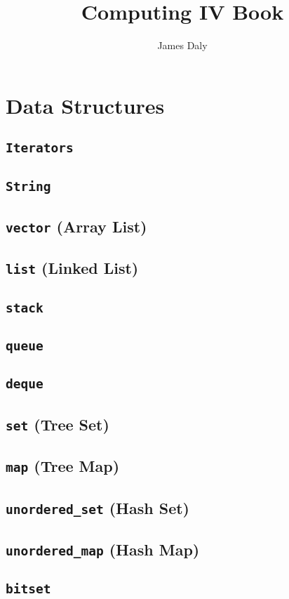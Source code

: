 \documentclass[letterpaper,10pt]{book}
\title{Computing IV Book}
\author{James Daly}
\newcommand{\code}[1]{\texttt{#1}}
\begin{document}
\maketitle

\tableofcontents

\part{Data Structures}
\chapter{\code{Iterators}}
\chapter{\code{String}}
\chapter{\code{vector} (Array List)}
\chapter{\code{list} (Linked List)}
\chapter{\code{stack}}
\chapter{\code{queue}}
\chapter{\code{deque}}
\chapter{\code{set} (Tree Set)}
\chapter{\code{map} (Tree Map)}
\chapter{\code{unordered\_set} (Hash Set)}
\chapter{\code{unordered\_map} (Hash Map)}
\chapter{\code{bitset}}
\end{document}
